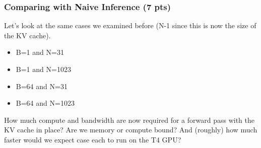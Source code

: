 \begin{answer}
  
\end{answer}

\subsubsection{Comparing with Naive Inference (7 pts)}

Let's look at the same cases we examined before (N-1 since this is now the size of the KV cache).
\begin{itemize}
    \item B=1 and N=31
    \item B=1 and N=1023
    \item B=64 and N=31
    \item B=64 and N=1023
\end{itemize}

How much compute and bandwidth are now required for a forward pass with the KV cache in place? Are we memory or compute bound? And (roughly) how much faster would we expect case each to run on the T4 GPU?

\begin{answer}
   
\end{answer}